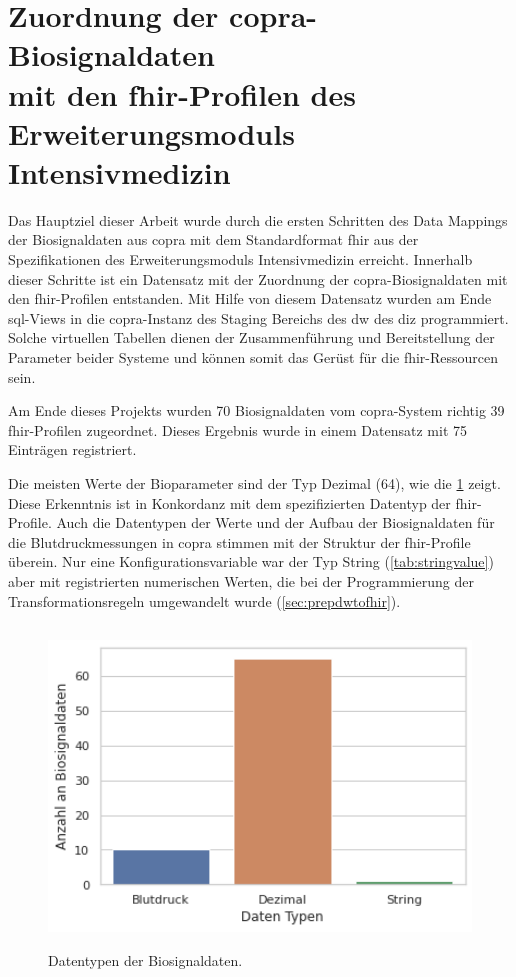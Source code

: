 \section[Zuordnung der \acs{copra}-Biosignaldaten mit den \acs{fhir}-Profilen des Erweiterungsmoduls \glqq Intensivmedizin\grqq{}]{Zuordnung der \acs{copra}-Biosignaldaten \\ mit den \acs{fhir}-Profilen des Erweiterungsmoduls \glqq Intensivmedizin\grqq{}} \label{sect:resdatamapping}

Das Hauptziel dieser Arbeit wurde durch die ersten Schritten des Data Mappings der Biosignaldaten aus \ac{copra} mit dem Standardformat \ac{fhir} aus der Spezifikationen des Erweiterungsmoduls \glqq Intensivmedizin\grqq{} erreicht. Innerhalb dieser Schritte ist ein Datensatz mit der Zuordnung der \ac{copra}-Biosignaldaten mit den \ac{fhir}-Profilen entstanden. Mit Hilfe von diesem Datensatz wurden am Ende \ac{sql}-Views in die \ac{copra}-Instanz des Staging Bereichs des \ac{dw} des \ac{diz} programmiert. Solche virtuellen Tabellen dienen der Zusammenführung und Bereitstellung der Parameter beider Systeme und können somit das Gerüst für die \ac{fhir}-Ressourcen sein.

Am Ende dieses Projekts wurden 70 Biosignaldaten vom \ac{copra}-System richtig 39 \ac{fhir}-Profilen zugeordnet. Dieses Ergebnis wurde in einem Datensatz mit 75 Einträgen registriert.

Die meisten Werte der Bioparameter sind der Typ Dezimal (64), wie die \ref{fig:signaldatatyps} zeigt. Diese Erkenntnis ist in Konkordanz mit dem spezifizierten Datentyp der \ac{fhir}-Profile. Auch die Datentypen der Werte und der Aufbau der Biosignaldaten für die Blutdruckmessungen in \ac{copra} stimmen mit der Struktur der \ac{fhir}-Profile überein. Nur eine Konfigurationsvariable war der Typ String (\ref{tab:stringvalue}) aber mit registrierten numerischen Werten, die bei der Programmierung der Transformationsregeln umgewandelt wurde (\ref{sec:prepdwtofhir}).

\begin{figure}[ht]
	\centering
	\includegraphics[height=8.5cm]{figures/biosignal_data_types}
	\caption[Datentypen der Biosignaldaten]{Datentypen der Biosignaldaten.}
	\label{fig:signaldatatyps}
\end{figure}

